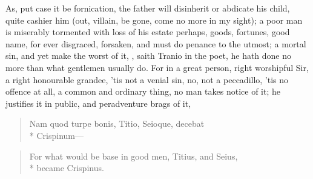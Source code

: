 {As, put case it be fornication, the father will disinherit or abdicate
his child, quite cashier him (out, villain, be gone, come no more in my
sight); a poor man is miserably tormented with loss of his estate
perhaps, goods, fortunes, good name, for ever disgraced, forsaken, and
must do penance to the utmost; a mortal sin, and yet make the worst of
it, , saith Tranio in the poet,  he hath done no more than what gentlemen
usually do.  For in a great person, right worshipful Sir, a right honourable
grandee, 'tis not a venial sin, no, not a peccadillo, 'tis no offence
at all, a common and ordinary thing, no man takes notice of it; he
justifies it in public, and peradventure brags of it,

\begin{verse}
\textlatin{Nam quod turpe bonis, Titio, Seioque, decebat}\\*
\textlatin{Crispinum}---
\end{verse}

\begin{verse}
For what would be base in good men, Titius, and Seius,\\*
became Crispinus.
\end{verse}

}
